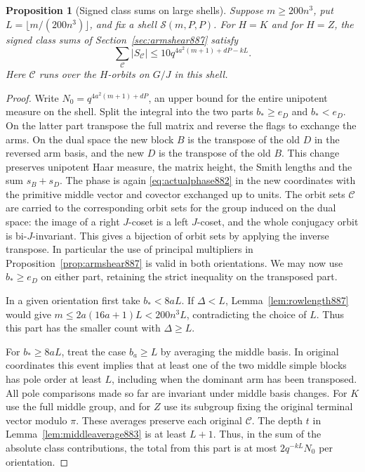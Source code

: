 \documentclass[a4paper,11pt]{article}
\newtheorem{proposition}{Proposition}[section]
\theoremstyle{definition}
\theoremstyle{remark}
\numberwithin{equation}{section}
\begin{document}
\begin{proposition}[Signed class sums on large shells]
\leavevmode\label{prop:largeshell888}
Suppose \(m\ge200n^3\), put \(L=\lfloor m/(200n^3)\rfloor\), and
fix a shell \(\mathcal S(m,P,P)\). For \(H=K\) and for \(H=Z\),
the signed class sums of Section~\ref{sec:armshear887} satisfy
\begin{equation}
 \sum_{\mathcal C}|S_{\mathcal C}|
        \le 10 q^{4a^2(m+1)+dP-kL}.
 \label{eq:largeshell888}
\end{equation}
Here \(\mathcal C\) runs over the \(H\)-orbits on \(G/J\) in
this shell.
\end{proposition}
\begin{proof}
Write \(N_0=q^{4a^2(m+1)+dP}\), an upper bound for the entire
unipotent measure on the shell. Split the integral into the
two parts \(b_*\ge e_D\) and \(b_*<e_D\). On the latter part
transpose the full matrix and reverse the flags to exchange the
arms. On the dual space the new block \(B\) is the transpose
of the old \(D\) in the reversed arm basis, and the new \(D\)
is the transpose of the old \(B\). This change preserves unipotent
Haar measure, the matrix height, the Smith lengths and the sum
\(s_B+s_D\). The phase is again \eqref{eq:actualphase882} in the
new coordinates with the primitive middle vector and covector
exchanged up to units. The orbit sets \(\mathcal C\) are carried
to the corresponding orbit sets for the group induced on the
dual space: the image of a right \(J\)-coset is a left \(J\)-coset,
and the whole conjugacy orbit is bi-\(J\)-invariant. This gives
a bijection of orbit sets by applying the inverse transpose.
In particular the use of principal multipliers in
Proposition~\ref{prop:armshear887} is valid in both orientations.
We may now use \(b_*\ge e_D\) on either part, retaining the strict
inequality on the transposed part.

In a given orientation first take \(b_*<8aL\). If \(\Delta<L\),
Lemma~\ref{lem:rowlength887} would give
\(m\le2a(16a+1)L<200n^3L\), contradicting the choice of \(L\).
Thus this part has the smaller count with \(\Delta\ge L\).

For \(b_*\ge8aL\), treat the case \(b_a\ge L\) by averaging
the middle basis. In original coordinates this event implies
that at least one of the two middle simple blocks has pole order
at least \(L\), including when the dominant arm has been
transposed. All pole comparisons made so far are invariant under
middle basis changes. For \(K\) use the full middle group, and
for \(Z\) use its subgroup fixing the original terminal vector
modulo \(\pi\). These averages preserve each original
\(\mathcal C\). The depth \(t\) in Lemma~\ref{lem:middleaverage883}
is at least \(L+1\). Thus, in the sum of the absolute class
contributions, the total from this part is at most
\(2q^{-kL}N_0\) per orientation.


\end{proof}
\end{document}
